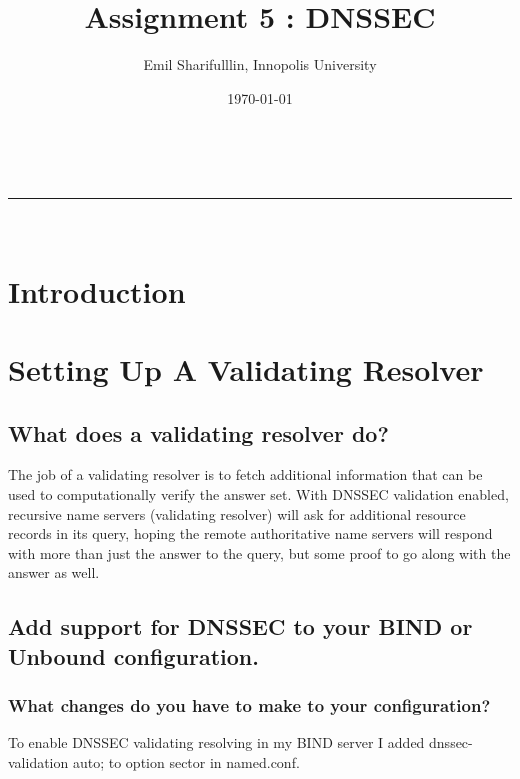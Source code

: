 \documentclass[a4paper,11pt]{article}
\makeatletter
\newcommand*{\TitleFont}{%
      \usefont{\encodingdefault}{\rmdefault}{b}{n}%
      \fontsize{16}{20}%
      \selectfont}
\renewcommand{\maketitle}{
\begin{center}
\vspace{2ex}
{\huge \textsc{\@title}}
\vspace{1ex}
\\
\rule{\linewidth}{0.5pt}\\
\@author \hfill \@date
\vspace{4ex}
\end{center}
}
\makeatother
\begin{document}






\title{ \TitleFont Assignment 5 : DNSSEC }

\author{Emil Sharifulllin, Innopolis University}

\date{\today}

\maketitle

\tableofcontents

\section{Introduction}

\section{Setting Up A Validating Resolver}

\subsection{What does a validating resolver do?}
The job of a validating resolver is to fetch additional information that can be used to computationally verify the answer set. With DNSSEC validation enabled, recursive name servers (validating resolver) will ask for additional resource records in its query, hoping the remote authoritative name servers will respond with more than just the answer to the query, but some proof to go along with the answer as well.

\subsection{Add support for DNSSEC to your BIND or Unbound configuration.}
\subsubsection{What changes do you have to make to your configuration?}
To enable DNSSEC validating resolving in my BIND server I added dnssec-validation auto; to option sector in named.conf.
\end{document}
